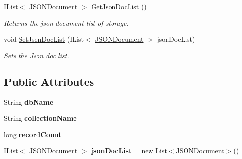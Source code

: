 \begin{DoxyCompactItemize}
I\+List$<$ \hyperlink{classcom_1_1shephertz_1_1app42_1_1paas_1_1sdk_1_1windows_1_1storage_1_1_storage_1_1_j_s_o_n_document}{J\+S\+O\+N\+Document} $>$ \hyperlink{classcom_1_1shephertz_1_1app42_1_1paas_1_1sdk_1_1windows_1_1storage_1_1_storage_a27052eb11450ef6a8441dca2d8532156}{Get\+Json\+Doc\+List} ()
\begin{DoxyCompactList}\small\item\em Returns the json document list of storage. \end{DoxyCompactList}\item 
void \hyperlink{classcom_1_1shephertz_1_1app42_1_1paas_1_1sdk_1_1windows_1_1storage_1_1_storage_a691038a39c8c5333287bbd1e2036aca2}{Set\+Json\+Doc\+List} (I\+List$<$ \hyperlink{classcom_1_1shephertz_1_1app42_1_1paas_1_1sdk_1_1windows_1_1storage_1_1_storage_1_1_j_s_o_n_document}{J\+S\+O\+N\+Document} $>$ json\+Doc\+List)
\begin{DoxyCompactList}\small\item\em Sets the Json doc list. \end{DoxyCompactList}\end{DoxyCompactItemize}
\subsection*{Public Attributes}
\begin{DoxyCompactItemize}
\item 
\hypertarget{classcom_1_1shephertz_1_1app42_1_1paas_1_1sdk_1_1windows_1_1storage_1_1_storage_aee78044a16dab31ee3ca88ebfddf3e1f}{String {\bfseries db\+Name}}\label{classcom_1_1shephertz_1_1app42_1_1paas_1_1sdk_1_1windows_1_1storage_1_1_storage_aee78044a16dab31ee3ca88ebfddf3e1f}

\item 
\hypertarget{classcom_1_1shephertz_1_1app42_1_1paas_1_1sdk_1_1windows_1_1storage_1_1_storage_aa1df386f52550fcd92a8f9f65ffd63bf}{String {\bfseries collection\+Name}}\label{classcom_1_1shephertz_1_1app42_1_1paas_1_1sdk_1_1windows_1_1storage_1_1_storage_aa1df386f52550fcd92a8f9f65ffd63bf}

\item 
\hypertarget{classcom_1_1shephertz_1_1app42_1_1paas_1_1sdk_1_1windows_1_1storage_1_1_storage_a1b71d6654ea42d1c315300429bdca7da}{long {\bfseries record\+Count}}\label{classcom_1_1shephertz_1_1app42_1_1paas_1_1sdk_1_1windows_1_1storage_1_1_storage_a1b71d6654ea42d1c315300429bdca7da}

\item 
\hypertarget{classcom_1_1shephertz_1_1app42_1_1paas_1_1sdk_1_1windows_1_1storage_1_1_storage_a904673fb69b2e7eac2524589767111f7}{I\+List$<$ \hyperlink{classcom_1_1shephertz_1_1app42_1_1paas_1_1sdk_1_1windows_1_1storage_1_1_storage_1_1_j_s_o_n_document}{J\+S\+O\+N\+Document} $>$ {\bfseries json\+Doc\+List} = new List$<$\hyperlink{classcom_1_1shephertz_1_1app42_1_1paas_1_1sdk_1_1windows_1_1storage_1_1_storage_1_1_j_s_o_n_document}{J\+S\+O\+N\+Document}$>$()}\label{classcom_1_1shephertz_1_1app42_1_1paas_1_1sdk_1_1windows_1_1storage_1_1_storage_a904673fb69b2e7eac2524589767111f7}

\end{DoxyCompactItemize}



